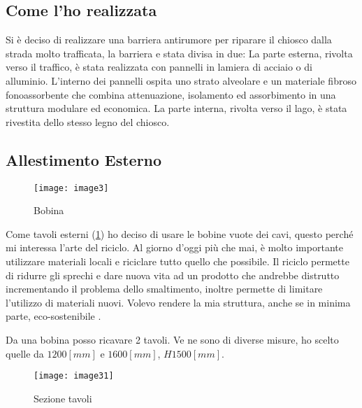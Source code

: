 \subsection{Come l’ho realizzata}

Si è deciso di realizzare una barriera antirumore per riparare il chiosco dalla strada molto trafficata, la barriera e stata divisa in due: La parte esterna, rivolta verso il traffico, è stata realizzata con pannelli in lamiera di acciaio o di alluminio. L'interno dei pannelli ospita uno strato alveolare e un materiale fibroso fonoassorbente che combina attenuazione, isolamento ed assorbimento in una struttura modulare ed economica. La parte interna, rivolta verso il lago, è stata rivestita dello stesso legno del chiosco. 

\subsection{Allestimento Esterno}

\begin{wrapfigure}[9]{r}{0.4\textwidth}
	\centering
	\texttt{[image: image3]}
	\caption{Bobina}
\end{wrapfigure}

Come tavoli esterni (\cref{fig:tavoli}) ho deciso di usare le bobine vuote dei cavi, questo perché mi interessa l’arte del riciclo. Al giorno d’oggi più che mai, è molto importante utilizzare materiali locali e riciclare tutto quello che possibile. Il riciclo permette di ridurre gli sprechi e  dare nuova vita ad un prodotto che andrebbe distrutto incrementando il problema dello smaltimento, inoltre permette di limitare l’utilizzo di materiali nuovi.  Volevo rendere la mia struttura, anche se in minima parte, eco-sostenibile .

Da una bobina posso ricavare 2 tavoli.  Ve ne sono di diverse misure, ho scelto quelle da  $1200 [mm]$ e $1600 [mm]$, $H 1500 [mm]$.

\begin{figure}[H]
	\centering
	\texttt{[image: image31]}
	\caption{Sezione tavoli}
	\label{fig:tavoli}
\end{figure}
